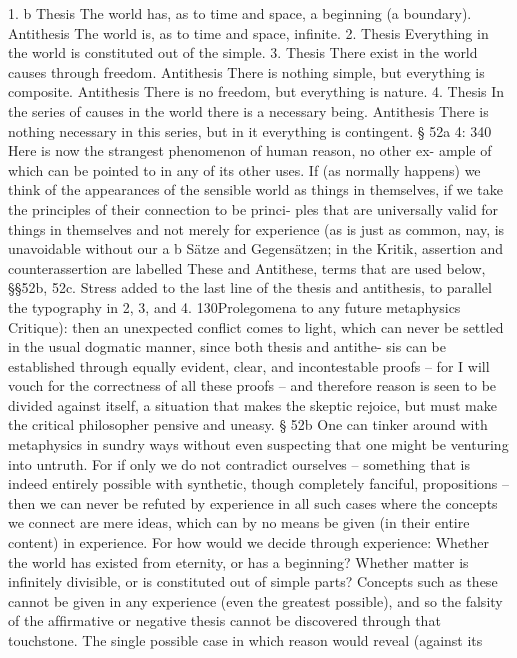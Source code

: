 1. b
Thesis
The world has, as to time and space,
a beginning (a boundary).
Antithesis
The world is, as to time and space,
inﬁnite.
2.
Thesis
Everything in the world
is constituted out of the
simple. 3.
Thesis
There exist in the world
causes through
freedom.
Antithesis
There is nothing simple,
but everything is
composite. Antithesis
There is no freedom,
but everything is
nature.
4.
Thesis
In the series of causes in the world there is a
necessary being.
Antithesis
There is nothing necessary in this series, but in it
everything is contingent.
§ 52a
4: 340
Here is now the strangest phenomenon of human reason, no other ex-
ample of which can be pointed to in any of its other uses. If (as normally
happens) we think of the appearances of the sensible world as things in
themselves, if we take the principles of their connection to be princi-
ples that are universally valid for things in themselves and not merely
for experience (as is just as common, nay, is unavoidable without our
a
b
Sätze and Gegensätzen; in the Kritik, assertion and counterassertion are labelled These and
Antithese, terms that are used below, §§52b, 52c.
Stress added to the last line of the thesis and antithesis, to parallel the typography in 2,
3, and 4.
130Prolegomena to any future metaphysics
Critique): then an unexpected conﬂict comes to light, which can never
be settled in the usual dogmatic manner, since both thesis and antithe-
sis can be established through equally evident, clear, and incontestable
proofs – for I will vouch for the correctness of all these proofs – and
therefore reason is seen to be divided against itself, a situation that makes
the skeptic rejoice, but must make the critical philosopher pensive and
uneasy.
§ 52b
One can tinker around with metaphysics in sundry ways without even
suspecting that one might be venturing into untruth. For if only we do
not contradict ourselves – something that is indeed entirely possible with
synthetic, though completely fanciful, propositions – then we can never
be refuted by experience in all such cases where the concepts we connect
are mere ideas, which can by no means be given (in their entire content) in
experience. For how would we decide through experience: Whether the
world has existed from eternity, or has a beginning? Whether matter is
inﬁnitely divisible, or is constituted out of simple parts? Concepts such as
these cannot be given in any experience (even the greatest possible), and
so the falsity of the afﬁrmative or negative thesis cannot be discovered
through that touchstone.
The single possible case in which reason would reveal (against its
